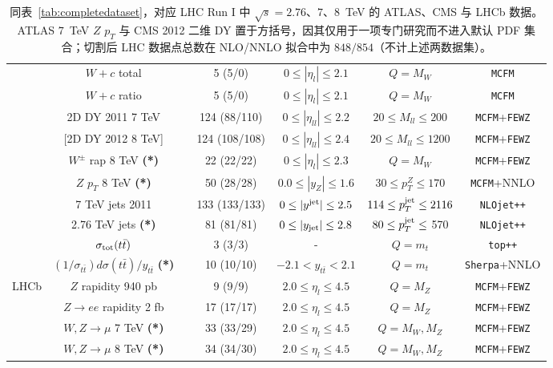 \begin{table}[ht]
\begin{centering}
\begin{tabular}{|c|c|c|c|c|c|c|}
&    $W+c$ total  & \cite{Chatrchyan:2013uja}& 5 (5/0) &  $0 \le |\eta_l| \le 2.1$ &
$Q=M_W$  & {\tt MCFM}
\tabularnewline
&    $W+c$ ratio  & \cite{Chatrchyan:2013uja}&  5 (5/0) & $0 \le |\eta_l| \le 2.1$ &
$Q=M_W$
& {\tt MCFM}
\tabularnewline
&   2D DY 2011 7 TeV    & \cite{Chatrchyan:2013tia} &   124 (88/110) & $0 \le |\eta_{ll}| \le 2.2$  &
$20 \le M_{ll} \le 200$  &  {\tt MCFM}+{\tt FEWZ}
\tabularnewline
&   [2D DY 2012 8 TeV]     & \cite{CMS:2014jea} &   124 (108/108) & $0 \le |\eta_{ll}| \le 2.4$  &
$20 \le M_{ll} \le 1200$  &  {\tt MCFM}+{\tt FEWZ}
\tabularnewline
&   $W^{\pm}$ rap 8 TeV  {\bf (*)}     & \cite{Khachatryan:2016pev} &  22 (22/22)   & $0 \le |\eta_{l}| \le 2.3$  &
$Q=M_W$  &  {\tt MCFM}+{\tt FEWZ}
\tabularnewline
&   $Z$ $p_T$ 8 TeV  {\bf (*)}     & \cite{Khachatryan:2015oaa} & 50 (28/28)    & $ 0.0 \le |y_{Z}| \le 1.6 $  &
$  30 \le p_T^Z \le 170 $   &  {\tt MCFM}+NNLO
\tabularnewline
 &   7 TeV jets 2011     & \cite{Chatrchyan:2012bja}&  133 (133/133) &  
$0 \le |y^{\rm jet}| \le 2.5$ & $114 \le p_T^{\rm jet} \le 2116$   &
{\tt NLOjet++}
\tabularnewline
 &   2.76 TeV jets  {\bf (*)}     & \cite{Khachatryan:2015luy}& 81 (81/81)   &  $0 \le |y_{\rm jet}| \le 2.8$
  & $80 \le p_T^{\rm jet} \le$ 570   & {\tt NLOjet++}
 \tabularnewline
&    $\sigma_{\rm tot}(t\bar{t})$   & \cite{Khachatryan:2016mqs,CMS:2016syx}& 
 3 (3/3) & - & $Q=m_t$ & {\tt top++} \tabularnewline
 &     $(1/\sigma_{t\bar{t}})d\sigma(t\bar{t})/y_{t\bar{t}}$ {\bf (*)}   & \cite{Khachatryan:2015oqa}& 
 10 (10/10)  & $-2.1<y_{t\bar{t}}<2.1$  & $Q=m_t$ & {\tt Sherpa}+NNLO \tabularnewline
 \hline
 \hline
\multirow{4}{*}{LHCb} &    $Z$ rapidity 940 pb  & \cite{Aaij:2012vn} &   9 (9/9) &
$2.0 \le \eta_l \le 4.5$& $Q=M_Z$ &
{\tt MCFM}+{\tt FEWZ} \tabularnewline
&    $Z\to ee$ rapidity 2 fb & \cite{Aaij:2012mda}&  17 (17/17) & $2.0 \le \eta_l \le 4.5$ & $Q=M_Z$  & {\tt MCFM}+{\tt FEWZ}
\tabularnewline
&    $W,Z\to \mu$ 7 TeV {\bf (*)}  & \cite{Aaij:2015gna} & 33 (33/29)  & $2.0 \le \eta_l \le 4.5$
& $Q=M_W,M_Z$ &  {\tt MCFM}+{\tt FEWZ}\tabularnewline
&    $W,Z\to \mu$ 8 TeV {\bf (*)}  & \cite{Aaij:2015zlq}  & 34 (34/30) & $2.0 \le \eta_l \le 4.5$
& $Q=M_W,M_Z$ &  {\tt MCFM}+{\tt FEWZ}  \tabularnewline
 \hline
 \end{tabular}
\par\end{centering}
\caption{\small 同表~\ref{tab:completedataset}，对应 LHC Run I 中 $\sqrt{s}=2.76$、$7$、$8$~TeV 的 ATLAS、CMS 与 LHCb 数据。ATLAS $7$~TeV $Z$ $p_T$ 与 CMS 2012 二维 DY 置于方括号，因其仅用于一项专门研究而不进入默认 PDF 集合；切割后 LHC 数据点总数在 NLO/NNLO 拟合中为 $848/854$（不计上述两数据集）。
\label{tab:completedataset3}}
\end{table}

